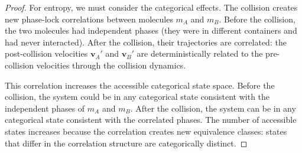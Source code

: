 \documentclass[12pt,a4paper]{article}
\theoremstyle{definition}
\theoremstyle{remark}
\begin{document}
\begin{proof}
For entropy, we must consider the categorical effects. The collision creates new phase-lock correlations between molecules $m_A$ and $m_B$. Before the collision, the two molecules had independent phases (they were in different containers and had never interacted). After the collision, their trajectories are correlated: the post-collision velocities $\mathbf{v}_A'$ and $\mathbf{v}_B'$ are deterministically related to the pre-collision velocities through the collision dynamics.

This correlation increases the accessible categorical state space. Before the collision, the system could be in any categorical state consistent with the independent phases of $m_A$ and $m_B$. After the collision, the system can be in any categorical state consistent with the correlated phases. The number of accessible states increases because the correlation creates new equivalence classes: states that differ in the correlation structure are categorically distinct.


\end{proof}
\end{document}
